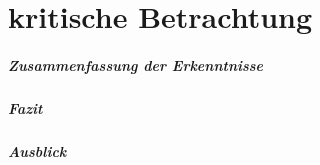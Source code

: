 \chapter{kritische Betrachtung}
\paragraph{Zusammenfassung der Erkenntnisse}
\paragraph{Fazit}
\paragraph{Ausblick}